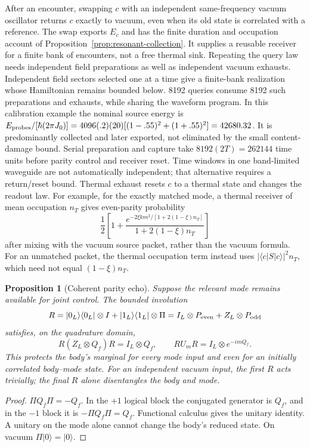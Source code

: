 \documentclass[aps,pre,onecolumn,superscriptaddress,floatfix,longbibliography]{revtex4-2}
\newtheorem{proposition}[theorem]{Proposition}
\begin{document}
After an encounter, swapping $c$ with an independent same-frequency vacuum
oscillator returns $c$ exactly to vacuum, even when its old state is correlated
with a reference. The swap exports $E_c$ and has the finite duration and
occupation account of Proposition~\ref{prop:resonant-collection}. It supplies
a reusable receiver for a finite bank of encounters, not a free thermal sink.
Repeating the query law needs independent field preparations as well as
independent vacuum exhausts. Independent field sectors selected one at a time
give a finite-bank realization whose Hamiltonian remains bounded below.
8192 queries consume 8192 such preparations and exhausts, while sharing the
waveform program. In this calibration example the nominal source energy is
$E_{\rm probes}/[\hbar(2\pi J_0)]=
4096(.2)(20)[(1-.55)^2+(1+.55)^2]=42680.32$.
It is predominantly collected and later exported, not
eliminated by the small content-damage bound. Serial preparation and capture
take $8192(2T)=262144$ time units before parity control and receiver reset.
Time windows in one band-limited waveguide are not
automatically independent; that alternative requires a return/reset bound.
Thermal exhaust resets $c$ to a thermal state and changes the readout law.
For example, for the exactly matched mode, a thermal receiver of mean
occupation $n_T$ gives even-parity
probability
\[
 \frac12\left[1+
 \frac{e^{-2\xi k m^2/[1+2(1-\xi)n_T]}}{1+2(1-\xi)n_T}\right]
\]
after mixing with the vacuum source packet, rather than the vacuum formula.
For an unmatched packet, the thermal occupation term instead uses
$|\langle c|S|c\rangle|^2n_T$, which need not equal $(1-\xi)n_T$.

\begin{proposition}[Coherent parity echo]
\label{prop:coherent-parity-echo}
Suppose the relevant mode remains available for joint control. The bounded
involution
\[
 R=|0_L\rangle\langle0_L|\otimes I+
   |1_L\rangle\langle1_L|\otimes\Pi
   =I_L\otimes P_{\rm even}+Z_L\otimes P_{\rm odd}
\]
satisfies, on the quadrature domain,
\begin{equation}
 R(Z_L\otimes Q_f)R=I_L\otimes Q_f,
 \qquad R U_m R=I_L\otimes e^{-imQ_f}.
 \label{eq:coherent-parity-echo}
\end{equation}
This protects the body's marginal for every mode input and even for an initially
correlated body--mode state. For an independent vacuum input, the first $R$
acts trivially; the final $R$ alone disentangles the body and mode.
\end{proposition}
\begin{proof}
$\Pi Q_f\Pi=-Q_f$. In the $+1$ logical block the conjugated generator is
$Q_f$, and in the $-1$ block it is $-\Pi Q_f\Pi=Q_f$.
Functional calculus gives the unitary identity. A unitary on the mode alone
cannot change the body's reduced state. On vacuum $\Pi|0\rangle=|0\rangle$.
\end{proof}
\end{document}
